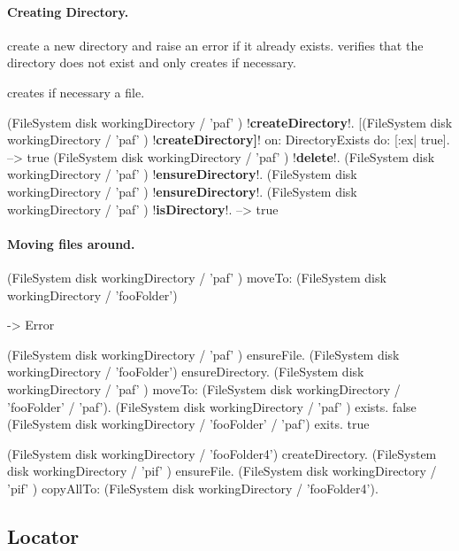 \documentclass[a4paper,10pt,twoside]{book}
\begin{document}
\paragraph{Creating Directory.}
 create a new directory and raise an error if it already exists. 
 verifies that the directory does not exist and only creates if necessary.

 creates if necessary a file.
 
 
\begin{code}{} 
(FileSystem disk workingDirectory / 'paf' ) !\textbf{createDirectory}!.
[(FileSystem disk workingDirectory / 'paf' ) !\textbf{createDirectory]}! on: DirectoryExists do: [:ex| true].
	--> true
(FileSystem disk workingDirectory / 'paf' ) !\textbf{delete}!.
(FileSystem disk workingDirectory / 'paf' ) !\textbf{ensureDirectory}!.
(FileSystem disk workingDirectory / 'paf' ) !\textbf{ensureDirectory}!.
(FileSystem disk workingDirectory / 'paf' ) !\textbf{isDirectory}!.
  --> true
\end{code}

\paragraph{Moving files around.}

\begin{code}{}
(FileSystem disk workingDirectory / 'paf' ) moveTo: (FileSystem disk workingDirectory / 'fooFolder')

-> Error

(FileSystem disk workingDirectory / 'paf' ) ensureFile.
(FileSystem disk workingDirectory / 'fooFolder') ensureDirectory. 
(FileSystem disk workingDirectory / 'paf' ) moveTo: (FileSystem disk workingDirectory / 'fooFolder' / 'paf').
(FileSystem disk workingDirectory / 'paf' ) exists.
	false
(FileSystem disk workingDirectory / 'fooFolder' / 'paf') exits.
	true
\end{code}

\begin{code}{}
(FileSystem disk workingDirectory / 'fooFolder4') createDirectory. 
(FileSystem disk workingDirectory / 'pif' ) ensureFile.
(FileSystem disk workingDirectory / 'pif' ) copyAllTo: (FileSystem disk workingDirectory / 'fooFolder4').
\end{code}

\subsection{Locator}
\end{document}
